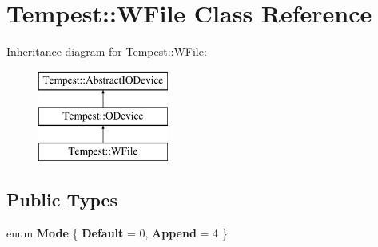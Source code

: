 \hypertarget{class_tempest_1_1_w_file}{\section{Tempest\+:\+:W\+File Class Reference}
\label{class_tempest_1_1_w_file}
}
Inheritance diagram for Tempest\+:\+:W\+File\+:\begin{figure}[H]
\begin{center}
\leavevmode
\includegraphics[height=3.000000cm]{class_tempest_1_1_w_file}
\end{center}
\end{figure}
\subsection*{Public Types}
\begin{DoxyCompactItemize}
\item 
\hypertarget{class_tempest_1_1_w_file_aaa833072d7fc469bf2f3b4ef79ea5732}{enum {\bfseries Mode} \{ {\bfseries Default} = 0, 
{\bfseries Append} = 4
 \}}\label{class_tempest_1_1_w_file_aaa833072d7fc469bf2f3b4ef79ea5732}

\end{DoxyCompactItemize}
